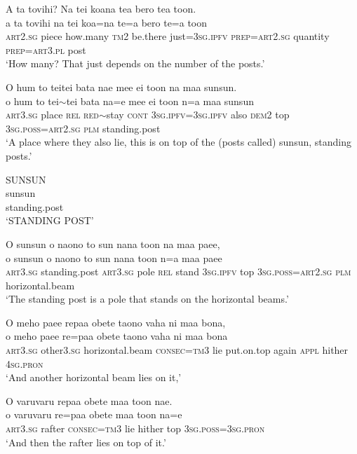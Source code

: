\ea\label{ex:text11-12}
A ta tovihi? Na tei koana tea bero tea toon.\\
\gll a	ta	tovihi	na	tei	koa=na	te=a	bero	te=a	toon\\
     \textsc{art}2.\textsc{sg}	piece	how.many	\textsc{tm}2	be.there	just=3\textsc{sg}.\textsc{ipfv}	\textsc{prep}=\textsc{art}2.\textsc{sg}	quantity	\textsc{prep}=\textsc{art}3.\textsc{pl}	post\\
\glt `How many? That just depends on the number of the posts.'
\z

\ea\label{ex:text11-13}
O hum to teitei bata nae mee ei toon na maa sunsun.\\
\gll o	hum	to	tei{$\sim$}tei	bata	na=e	mee	ei	toon	n=a	maa	sunsun\\
     \textsc{art}3.\textsc{sg}	place	\textsc{rel}	\textsc{red}{$\sim$}stay	\textsc{cont}	3\textsc{sg}.\textsc{ipfv}=3\textsc{sg}.\textsc{ipfv}	also	\textsc{dem}2	top	3\textsc{sg}.\textsc{poss}=\textsc{art}2.\textsc{sg}	\textsc{plm}	standing.post\\
\glt `A place where they also lie, this is on top of the (posts called) sunsun, standing posts.'
\z

\ea\label{ex:text11-14}
SUNSUN\\
\gll sunsun\\
     standing.post\\
\glt `STANDING POST'
\z

\ea\label{ex:text11-15}
O sunsun o naono to sun nana toon na maa paee,\\
\gll o	sunsun	o	naono	to	sun	nana	toon	n=a	maa	paee\\
     \textsc{art}3.\textsc{sg}	standing.post	\textsc{art}3.\textsc{sg}	pole	\textsc{rel}	stand	3\textsc{sg}.\textsc{ipfv}	top	3\textsc{sg}.\textsc{poss}=\textsc{art}2.\textsc{sg}	\textsc{plm}	horizontal.beam\\
\glt `The standing post is a pole that stands on the horizontal beams.'
\z

\ea\label{ex:text11-16}
O meho paee repaa obete taono vaha ni maa bona,\\
\gll o	meho	paee	re=paa	obete	taono	vaha	ni	maa	bona\\
     \textsc{art}3.\textsc{sg}	other3.\textsc{sg}	horizontal.beam	\textsc{consec}=\textsc{tm}3	lie	put.on.top	again	\textsc{appl}	hither	4\textsc{sg}.\textsc{pron}\\
\glt `And another horizontal beam lies on it,'
\z

\ea\label{ex:text11-17}
O varuvaru repaa obete maa toon nae.\\
\gll o	varuvaru	re=paa	obete	maa	toon	na=e\\
     \textsc{art}3.\textsc{sg}	rafter	\textsc{consec}=\textsc{tm}3	lie	hither	top	3\textsc{sg}.\textsc{poss}=3\textsc{sg}.\textsc{pron}\\
\glt `And then the rafter lies on top of it.'
\z

